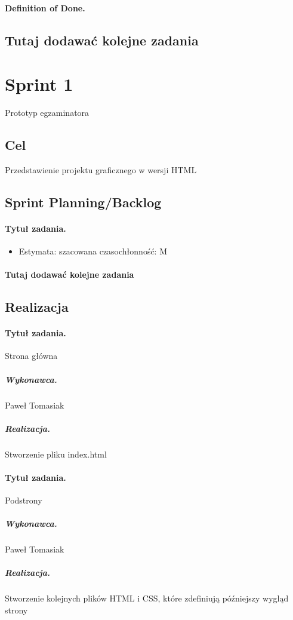 \documentclass[a4paper]{article}
\begin{document}
\paragraph{Definition of Done.} 

\subsection*{Tutaj dodawać kolejne zadania}

\section{Sprint 1} Prototyp egzaminatora
\subsection{Cel} Przedstawienie projektu graficznego w wersji HTML
\subsection{Sprint Planning/Backlog}

\paragraph{Tytuł zadania.} 
\begin{itemize}
\item Estymata: szacowana czasochłonność: M
\end{itemize}


\paragraph{Tutaj dodawać kolejne zadania}

\subsection{Realizacja}

\paragraph{Tytuł zadania.} Strona główna
\subparagraph{Wykonawca.} Paweł Tomasiak
\subparagraph{Realizacja.} Stworzenie pliku index.html 

\paragraph{Tytuł zadania.} Podstrony
\subparagraph{Wykonawca.} Paweł Tomasiak
\subparagraph{Realizacja.} Stworzenie kolejnych plików HTML i CSS, które zdefiniują późniejszy wygląd strony
\end{document}
